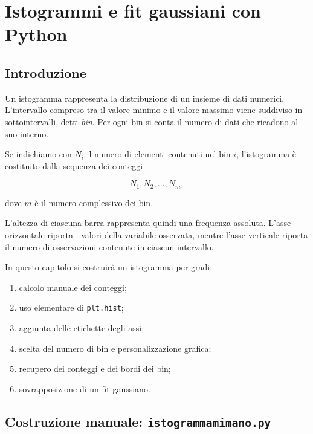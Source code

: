 %

\chapter{Istogrammi e fit gaussiani con Python}
\label{chap:istogrammi-fit}

\section{Introduzione}

Un istogramma rappresenta la distribuzione di un insieme di dati numerici.
L'intervallo compreso tra il valore minimo e il valore massimo viene
suddiviso in sottointervalli, detti \emph{bin}. Per ogni bin si conta il
numero di dati che ricadono al suo interno.

Se indichiamo con $N_i$ il numero di elementi contenuti nel bin $i$,
l'istogramma è costituito dalla sequenza dei conteggi

\[
N_1,N_2,\ldots,N_m,
\]

dove $m$ è il numero complessivo dei bin.

L'altezza di ciascuna barra rappresenta quindi una frequenza assoluta.
L'asse orizzontale riporta i valori della variabile osservata, mentre
l'asse verticale riporta il numero di osservazioni contenute in ciascun
intervallo.

In questo capitolo si costruirà un istogramma per gradi:

\begin{enumerate}
    \item calcolo manuale dei conteggi;
    \item uso elementare di \texttt{plt.hist};
    \item aggiunta delle etichette degli assi;
    \item scelta del numero di bin e personalizzazione grafica;
    \item recupero dei conteggi e dei bordi dei bin;
    \item sovrapposizione di un fit gaussiano.
\end{enumerate}

\section{Costruzione manuale: \texttt{istogrammamimano.py}}

